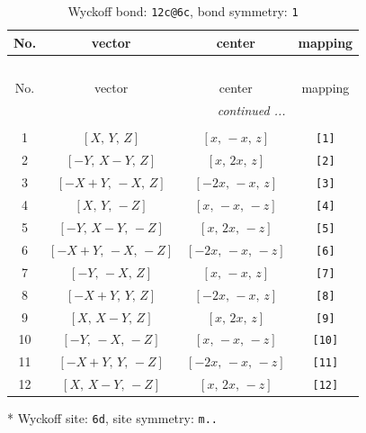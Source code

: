\documentclass[fleqn,8pt]{jsarticle}
\begin{document}
\begin{longtable}{cccc}
\caption{Wyckoff bond: {\tt 12c@6c}, bond symmetry: {\tt 1}}
 \\
 \hline \hline
No. & vector & center & mapping \\ \hline \endfirsthead

\multicolumn{3}{l}{\tablename\ \thetable{}} \\
 \hline \hline
No. & vector & center & mapping \\ \hline \endhead

 \hline \hline
\multicolumn{3}{r}{\footnotesize\it continued ...} \\ \endfoot

 \hline \hline
\multicolumn{3}{r}{} \\ \endlastfoot

1 & $\left[ X,\, Y,\, Z \right]$ & $\left[ x,\, - x,\, z \right]$ & {\tt [1]} \\ \hline
2 & $\left[ - Y,\, X - Y,\, Z \right]$ & $\left[ x,\, 2 x,\, z \right]$ & {\tt [2]} \\ \hline
3 & $\left[ - X + Y,\, - X,\, Z \right]$ & $\left[ - 2 x,\, - x,\, z \right]$ & {\tt [3]} \\ \hline
4 & $\left[ X,\, Y,\, - Z \right]$ & $\left[ x,\, - x,\, - z \right]$ & {\tt [4]} \\ \hline
5 & $\left[ - Y,\, X - Y,\, - Z \right]$ & $\left[ x,\, 2 x,\, - z \right]$ & {\tt [5]} \\ \hline
6 & $\left[ - X + Y,\, - X,\, - Z \right]$ & $\left[ - 2 x,\, - x,\, - z \right]$ & {\tt [6]} \\ \hline
7 & $\left[ - Y,\, - X,\, Z \right]$ & $\left[ x,\, - x,\, z \right]$ & {\tt [7]} \\ \hline
8 & $\left[ - X + Y,\, Y,\, Z \right]$ & $\left[ - 2 x,\, - x,\, z \right]$ & {\tt [8]} \\ \hline
9 & $\left[ X,\, X - Y,\, Z \right]$ & $\left[ x,\, 2 x,\, z \right]$ & {\tt [9]} \\ \hline
10 & $\left[ - Y,\, - X,\, - Z \right]$ & $\left[ x,\, - x,\, - z \right]$ & {\tt [10]} \\ \hline
11 & $\left[ - X + Y,\, Y,\, - Z \right]$ & $\left[ - 2 x,\, - x,\, - z \right]$ & {\tt [11]} \\ \hline
12 & $\left[ X,\, X - Y,\, - Z \right]$ & $\left[ x,\, 2 x,\, - z \right]$ & {\tt [12]} \\
\end{longtable}
* Wyckoff site: {\tt 6d}, site symmetry: {\tt m..}
\renewcommand{\arraystretch}{1.2}
\end{document}
